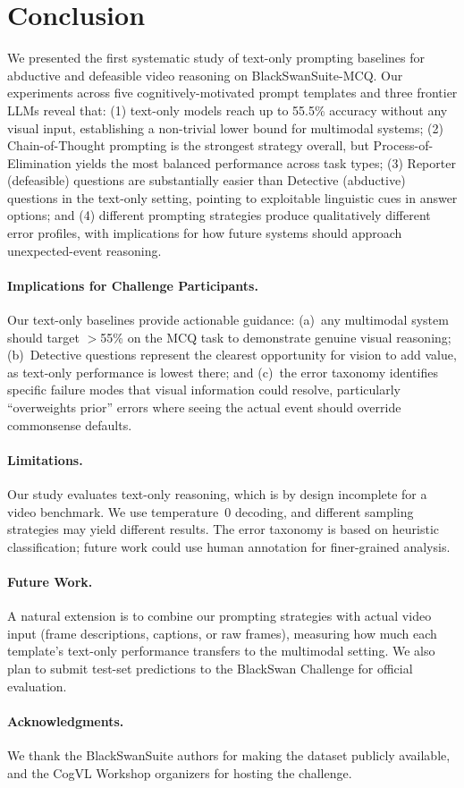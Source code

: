 \section{Conclusion}
\label{sec:conclusion}

We presented the first systematic study of text-only prompting baselines for abductive and defeasible video reasoning on BlackSwanSuite-MCQ.
Our experiments across five cognitively-motivated prompt templates and three frontier LLMs reveal that:
(1) text-only models reach up to 55.5\% accuracy without any visual input, establishing a non-trivial lower bound for multimodal systems;
(2) Chain-of-Thought prompting is the strongest strategy overall, but Process-of-Elimination yields the most balanced performance across task types;
(3) Reporter (defeasible) questions are substantially easier than Detective (abductive) questions in the text-only setting, pointing to exploitable linguistic cues in answer options;
and (4) different prompting strategies produce qualitatively different error profiles, with implications for how future systems should approach unexpected-event reasoning.

\paragraph{Implications for Challenge Participants.}
Our text-only baselines provide actionable guidance: (a)~any multimodal system should target $>$55\% on the MCQ task to demonstrate genuine visual reasoning; (b)~Detective questions represent the clearest opportunity for vision to add value, as text-only performance is lowest there; and (c)~the error taxonomy identifies specific failure modes that visual information could resolve, particularly ``overweights prior'' errors where seeing the actual event should override commonsense defaults.

\paragraph{Limitations.}
Our study evaluates text-only reasoning, which is by design incomplete for a video benchmark.
We use temperature~0 decoding, and different sampling strategies may yield different results.
The error taxonomy is based on heuristic classification; future work could use human annotation for finer-grained analysis.

\paragraph{Future Work.}
A natural extension is to combine our prompting strategies with actual video input (frame descriptions, captions, or raw frames), measuring how much each template's text-only performance transfers to the multimodal setting.
We also plan to submit test-set predictions to the BlackSwan Challenge for official evaluation.

\paragraph{Acknowledgments.}
We thank the BlackSwanSuite authors for making the dataset publicly available, and the CogVL Workshop organizers for hosting the challenge.
